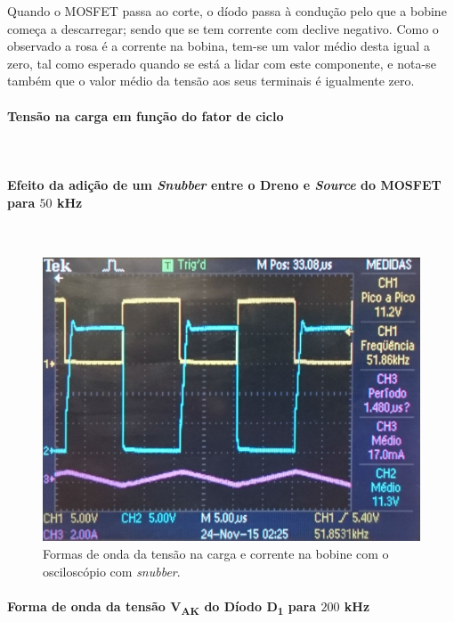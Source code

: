 \documentclass[a4paper,11pt]{article}
\numberwithin{equation}{section}
\begin{document}
Quando o MOSFET passa ao corte, o díodo passa à condução pelo que a bobine começa a descarregar; sendo que se tem corrente com declive negativo. Como o observado a rosa é a corrente na bobina, tem-se um valor médio desta igual a zero, tal como esperado quando se está a lidar com este componente, e nota-se também que o valor médio da tensão aos seus terminais é igualmente zero.

\paragraph{Tensão na carga em função do fator de ciclo}\mbox{}\



\paragraph{Efeito da adição de um \textit{Snubber} entre o Dreno e \textit{Source} do MOSFET para $50$ kHz}\mbox{}\

\begin{figure}[H]
	\centering
	\includegraphics[keepaspectratio=true, scale=0.175]{img/figs/snubber_buck}
	\caption{Formas de onda da tensão na carga e corrente na bobine com o osciloscópio com \textit{snubber}.}
	\label{fig:snubber_buck}
	\vspace{-0.8em}
\end{figure}



\paragraph{Forma de onda da tensão V\textsubscript{AK} do Díodo D\textsubscript{1} para $200$ kHz}\mbox{}\
\end{document}
